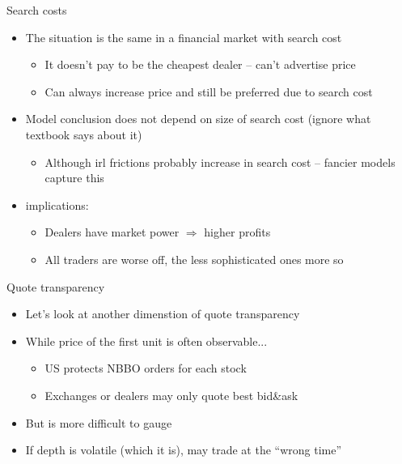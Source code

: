 \documentclass[english,10pt
,aspectratio=169
]{beamer}
\begin{document}
\begin{frame}{Search costs}
	\begin{itemize}
		\item The situation is the same in a financial market with search cost
		\begin{itemize}
			\item It doesn't pay to be the cheapest dealer -- can't advertise price
			\item Can always increase price and still be preferred due to search cost
		\end{itemize}
		\item Model conclusion does not depend on size of search cost (ignore what textbook says about it)
		\begin{itemize}
			\item Although irl frictions probably increase in search cost -- fancier models capture this
		\end{itemize}
		\item {} implications:
		\begin{itemize}
			\item \alert{Dealers} have market power $\Rightarrow$ \alert{higher profits}
			\item All \alert{traders are worse off}, the less sophisticated ones more so
		\end{itemize}
	\end{itemize}
\end{frame}


\begin{frame}{Quote transparency}
	\begin{itemize}
		\item Let's look at another dimenstion of quote transparency
		\item While price of the first unit is often observable...
		\begin{itemize}
			\item US protects NBBO orders for each stock
			\item Exchanges or dealers may only quote best bid\&ask
		\end{itemize}
		\item But  is more difficult to gauge
		\item If depth is volatile (which it is), may trade at the ``wrong time''
	\end{itemize}
\end{frame}
\end{document}
